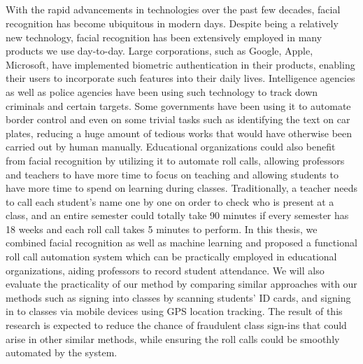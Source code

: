 \begin{center}
  \section*{\abstractname}
\end{center}
\large

With the rapid advancements in technologies over the past few decades, facial recognition has become
ubiquitous in modern days. Despite being a relatively new technology, facial recognition has been
extensively employed in many products we use day-to-day. Large corporations, such as Google, Apple, Microsoft, 
have implemented biometric authentication in their products, enabling their users to incorporate
such features into their daily lives. Intelligence agencies as well as police agencies have been using
such technology to track down criminals and certain targets. Some governments have been using it to automate
border control and even on some trivial tasks such as identifying the text on car plates, reducing a huge amount
of tedious works that would have otherwise been carried out by human manually. Educational organizations
could also benefit from facial recognition by utilizing it to automate roll calls, allowing professors and teachers
to have more time to focus on teaching and allowing students to have more time to spend on learning during classes.
Traditionally, a teacher needs to call each student's name one by one on order to check who is present at a class,
and an entire semester could totally take 90 minutes if every semester has 18 weeks and each roll call takes
5 minutes to perform. In this thesis, we combined facial recognition as well as machine learning and proposed
a functional roll call automation system which can be practically employed in educational organizations, 
aiding professors to record student attendance. We will also evaluate the practicality of our method by comparing
similar approaches with our methods such as signing into classes by scanning students' ID cards, and
signing in to classes via mobile devices using GPS location tracking. The result of this research is expected to
reduce the chance of fraudulent class sign-ins that could arise in other similar methods, while ensuring the roll calls
could be smoothly automated by the system.
\newpage
